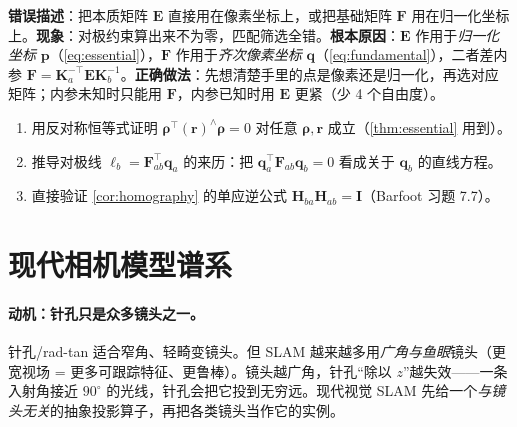 \begin{pitfall}
\textbf{错误描述}：把本质矩阵 $\mathbf{E}$ 直接用在像素坐标上，或把基础矩阵 $\mathbf{F}$ 用在归一化坐标上。\textbf{现象}：对极约束算出来不为零，匹配筛选全错。\textbf{根本原因}：$\mathbf{E}$ 作用于\emph{归一化坐标} $\mathbf{p}$（\cref{eq:essential}），$\mathbf{F}$ 作用于\emph{齐次像素坐标} $\mathbf{q}$（\cref{eq:fundamental}），二者差内参 $\mathbf{F}=\mathbf{K}_a^{-\top}\mathbf{E}\mathbf{K}_b^{-1}$。\textbf{正确做法}：先想清楚手里的点是像素还是归一化，再选对应矩阵；内参未知时只能用 $\mathbf{F}$，内参已知时用 $\mathbf{E}$ 更紧（少 4 个自由度）。
\end{pitfall}

\begin{practice}
\begin{enumerate}
  \item 用反对称恒等式证明 $\boldsymbol\rho^\top(\mathbf{r})^\wedge\boldsymbol\rho=0$ 对任意 $\boldsymbol\rho,\mathbf{r}$ 成立（\cref{thm:essential} 用到）。
  \item 推导对极线 $\boldsymbol\ell_b=\mathbf{F}_{ab}^\top\mathbf{q}_a$ 的来历：把 $\mathbf{q}_a^\top\mathbf{F}_{ab}\mathbf{q}_b=0$ 看成关于 $\mathbf{q}_b$ 的直线方程。
  \item 直接验证 \cref{cor:homography} 的单应逆公式 $\mathbf{H}_{ba}\mathbf{H}_{ab}=\mathbf{I}$（Barfoot 习题 7.7）。
\end{enumerate}
\end{practice}

\section{现代相机模型谱系}
\label{sec:cam-modern}

\paragraph{动机：针孔只是众多镜头之一。}
针孔/rad-tan 适合窄角、轻畸变镜头。但 SLAM 越来越多用\emph{广角与鱼眼}镜头（更宽视场 = 更多可跟踪特征、更鲁棒）\cite{carlone2026handbook}。镜头越广角，针孔“除以 $z$”越失效——一条入射角接近 $90^\circ$ 的光线，针孔会把它投到无穷远。现代视觉 SLAM 先给一个\emph{与镜头无关}的抽象投影算子，再把各类镜头当作它的实例。


